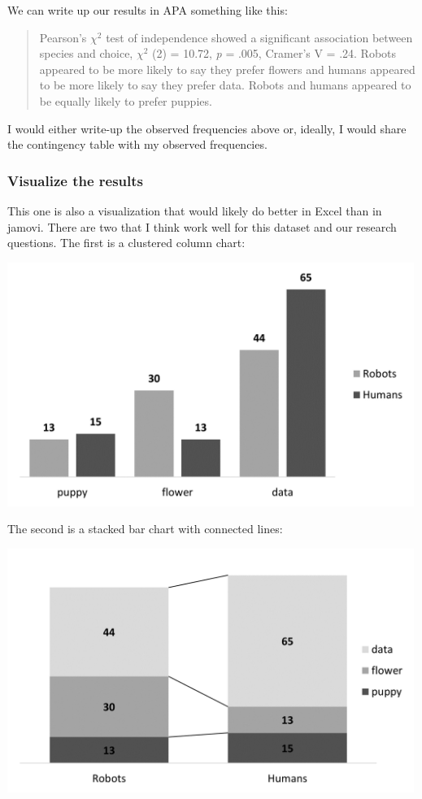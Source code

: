 \documentclass[
]{book}
\begin{document}
We can write up our results in APA something like this:

\begin{quote}
Pearson's \(\chi^2\) test of independence showed a significant association between species and choice, \(\chi^2\) (2) = 10.72, \emph{p} = .005, Cramer's V = .24. Robots appeared to be more likely to say they prefer flowers and humans appeared to be more likely to say they prefer data. Robots and humans appeared to be equally likely to prefer puppies.
\end{quote}

I would either write-up the observed frequencies above or, ideally, I would share the contingency table with my observed frequencies.

\hypertarget{visualize-the-results-4}{%
\subsubsection{Visualize the results}\label{visualize-the-results-4}}

This one is also a visualization that would likely do better in Excel than in jamovi. There are two that I think work well for this dataset and our research questions. The first is a clustered column chart:

\includegraphics[width=5.20833in,height=\textheight]{images/11-independence/independence_excel1.png}

The second is a stacked bar chart with connected lines:

\includegraphics[width=5.20833in,height=\textheight]{images/11-independence/independence_excel2.png}
\end{document}
